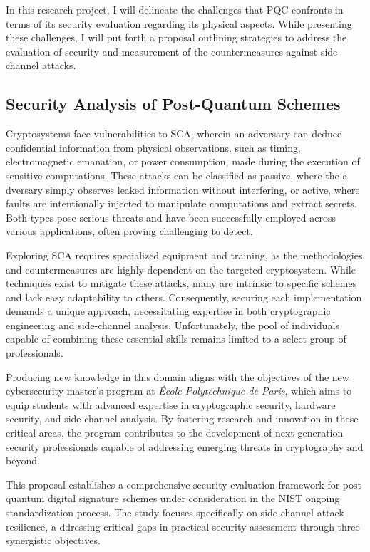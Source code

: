 \documentclass[11pt, a4paper]{article}
\begin{document}
In this research project, I will delineate the challenges that PQC confronts 
in terms of its security evaluation regarding its physical aspects. While presenting these challenges, 
I will put forth a proposal outlining strategies to address the evaluation of security and measurement of 
the countermeasures against side-channel attacks. 

\subsection*{Security Analysis of Post-Quantum Schemes}\label{sec:an}\vspace{-0.1cm}

Cryptosystems face vulnerabilities to SCA, wherein an adversary can deduce 
confidential information from physical observations, such as timing,
electromagnetic emanation, or power consumption, made during the execution of 
sensitive computations. These attacks can be classified as passive, where the a
dversary simply observes leaked information without interfering, or active, 
where faults are intentionally injected to manipulate computations and extract 
secrets. Both types pose serious threats and have been successfully employed 
across various applications, often proving challenging to detect.

Exploring SCA requires specialized equipment and training, as the 
methodologies and countermeasures are highly dependent on the targeted 
cryptosystem. While techniques exist to mitigate these attacks, many are 
intrinsic to specific schemes and lack easy adaptability to others. Consequently, 
securing each implementation demands a unique approach, necessitating 
expertise in both cryptographic engineering and side-channel analysis. 
Unfortunately, the pool of individuals capable of combining these
essential skills remains limited to a select group of professionals.



Producing new knowledge in this domain aligns with the objectives of the new cybersecurity 
master's program at \emph{École Polytechnique de Paris}, which aims to equip students with advanced 
expertise in cryptographic security, hardware security, and side-channel analysis. By fostering 
research and innovation in these critical areas, the program contributes to the development of 
next-generation security professionals capable of addressing emerging threats in cryptography 
and beyond.

This proposal establishes a comprehensive security evaluation framework for 
post-quantum digital signature schemes under consideration in the
NIST ongoing standardization process. 
The study focuses specifically on side-channel attack resilience, a
ddressing critical gaps in practical security assessment through three 
synergistic objectives.
\end{document}
